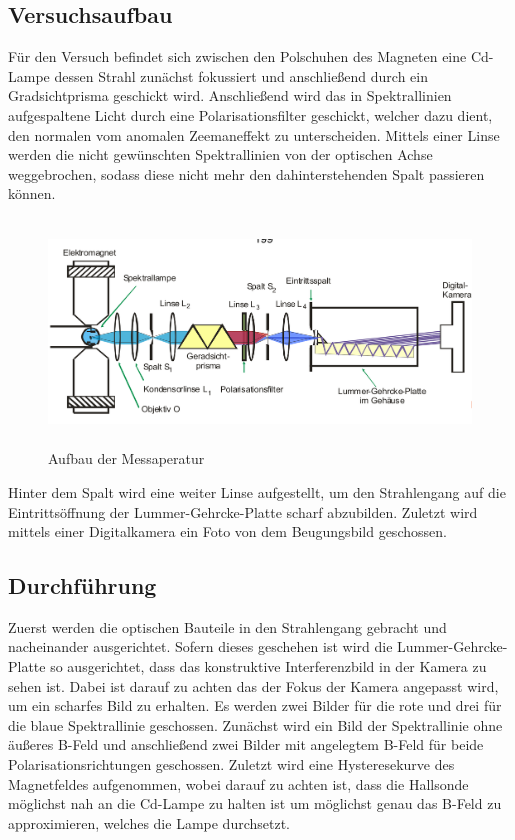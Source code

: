 \subsection{Versuchsaufbau}
Für den Versuch befindet sich zwischen den Polschuhen des Magneten eine Cd-Lampe dessen Strahl zunächst fokussiert und anschließend durch ein Gradsichtprisma geschickt wird. Anschließend wird das in Spektrallinien aufgespaltene Licht durch eine Polarisationsfilter geschickt, welcher dazu dient, den normalen vom anomalen Zeemaneffekt zu unterscheiden. Mittels einer Linse werden die nicht gewünschten Spektrallinien von der optischen Achse weggebrochen, sodass diese nicht mehr den dahinterstehenden Spalt passieren können.
\begin{figure}[H]
  \centering
  \includegraphics[height=6cm]{Bilder/Aufbau.png}
  \caption{Aufbau der Messaperatur \cite{V27}}
\end{figure}
Hinter dem Spalt wird eine weiter Linse aufgestellt, um den Strahlengang auf die Eintrittsöffnung der Lummer-Gehrcke-Platte scharf abzubilden. Zuletzt wird mittels einer Digitalkamera ein Foto von dem Beugungsbild geschossen.

\subsection{Durchführung}
Zuerst werden die optischen Bauteile in den Strahlengang gebracht und nacheinander ausgerichtet. Sofern dieses geschehen ist wird die Lummer-Gehrcke-Platte so ausgerichtet, dass das konstruktive Interferenzbild in der Kamera zu sehen ist. Dabei ist darauf zu achten das der Fokus der Kamera angepasst wird, um ein scharfes Bild zu erhalten. Es werden zwei Bilder für die rote und drei für die blaue Spektrallinie geschossen. Zunächst wird ein Bild der Spektrallinie ohne äußeres B-Feld und anschließend zwei Bilder mit angelegtem B-Feld für beide Polarisationsrichtungen geschossen. Zuletzt wird eine Hysteresekurve des Magnetfeldes aufgenommen, wobei darauf zu achten ist, dass die Hallsonde möglichst nah an die Cd-Lampe zu halten ist um möglichst genau das B-Feld zu approximieren, welches die Lampe durchsetzt.
